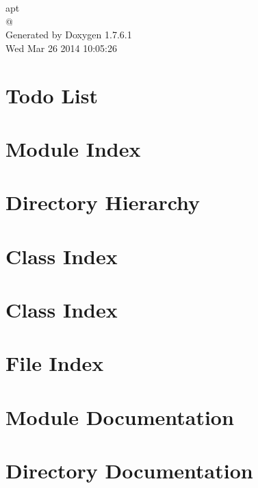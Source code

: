 \documentclass[a4paper]{book}
\begin{document}
\begin{titlepage}
\vspace*{7cm}
\begin{center}
{\Large apt \\[1ex]\large @ }\\
\vspace*{1cm}
{\large \-Generated by Doxygen 1.7.6.1}\\
\vspace*{0.5cm}
{\small Wed Mar 26 2014 10:05:26}\\
\end{center}
\end{titlepage}
\clearemptydoublepage
{}
\tableofcontents
\clearemptydoublepage
{}
\chapter{\-Todo \-List}
\label{todo}

\chapter{\-Module \-Index}

\chapter{\-Directory \-Hierarchy}

\chapter{\-Class \-Index}

\chapter{\-Class \-Index}

\chapter{\-File \-Index}

\chapter{\-Module \-Documentation}

\chapter{\-Directory \-Documentation}




\end{document}
